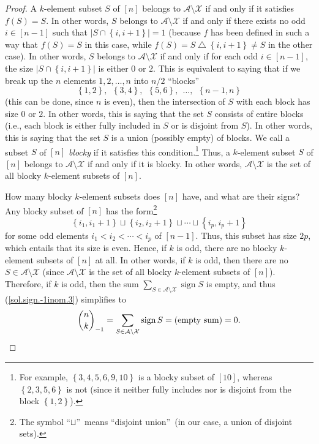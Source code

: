 \begin{proof}
A $k$-element subset $S$ of $\left[  n\right]  $ belongs to $\mathcal{A}%
\setminus\mathcal{X}$ if and only if it satisfies $f\left(  S\right)  =S$. In
other words, $S$ belongs to $\mathcal{A}\setminus\mathcal{X}$ if and only if
there exists no odd $i\in\left[  n-1\right]  $ such that $\left\vert
S\cap\left\{  i,i+1\right\}  \right\vert =1$ (because $f$ has been defined in
such a way that $f\left(  S\right)  =S$ in this case, while $f\left(
S\right)  =S\bigtriangleup\left\{  i,i+1\right\}  \neq S$ in the other case).
In other words, $S$ belongs to $\mathcal{A}\setminus\mathcal{X}$ if and only
if for each odd $i\in\left[  n-1\right]  $, the size $\left\vert S\cap\left\{
i,i+1\right\}  \right\vert $ is either $0$ or $2$. This is equivalent to
saying that if we break up the $n$ elements $1,2,\ldots,n$ into $n/2$
\textquotedblleft blocks\textquotedblright\
\[
\left\{  1,2\right\}  ,\ \ \left\{  3,4\right\}  ,\ \ \left\{  5,6\right\}
,\ \ \ldots,\ \ \left\{  n-1,n\right\}
\]
(this can be done, since $n$ is even), then the intersection of $S$ with each
block has size $0$ or $2$. In other words, this is saying that the set $S$
consists of entire blocks (i.e., each block is either fully included in $S$ or
is disjoint from $S$). In other words, this is saying that the set $S$ is a
union (possibly empty) of blocks. We call a subset $S$ of $\left[  n\right]  $
\emph{blocky} if it satisfies this condition.\footnote{For example, $\left\{
3,4,5,6,9,10\right\}  $ is a blocky subset of $\left[  10\right]  $, whereas
$\left\{  2,3,5,6\right\}  $ is not (since it neither fully includes nor is
disjoint from the block $\left\{  1,2\right\}  $).} Thus, a $k$-element subset
$S$ of $\left[  n\right]  $ belongs to $\mathcal{A}\setminus\mathcal{X}$ if
and only if it is blocky. In other words, $\mathcal{A}\setminus\mathcal{X}$ is
the set of all blocky $k$-element subsets of $\left[  n\right]  $.

How many blocky $k$-element subsets does $\left[  n\right]  $ have, and what
are their signs? Any blocky subset of $\left[  n\right]  $ has the
form\footnote{The symbol \textquotedblleft$\sqcup$\textquotedblright\ means
\textquotedblleft disjoint union\textquotedblright\ (in our case, a union of
disjoint sets).}%
\[
\left\{  i_{1},i_{1}+1\right\}  \sqcup\left\{  i_{2},i_{2}+1\right\}
\sqcup\cdots\sqcup\left\{  i_{p},i_{p}+1\right\}
\]
for some odd elements $i_{1}<i_{2}<\cdots<i_{p}$ of $\left[  n-1\right]  $.
Thus, this subset has size $2p$, which entails that its size is even. Hence,
if $k$ is odd, there are no blocky $k$-element subsets of $\left[  n\right]  $
at all. In other words, if $k$ is odd, then there are no $S\in\mathcal{A}%
\setminus\mathcal{X}$ (since $\mathcal{A}\setminus\mathcal{X}$ is the set of
all blocky $k$-element subsets of $\left[  n\right]  $). Therefore, if $k$ is
odd, then the sum $\sum_{S\in\mathcal{A}\setminus\mathcal{X}}%
\operatorname*{sign}S$ is empty, and thus (\ref{sol.sign.-1inom.3}) simplifies
to%
\begin{equation}
\dbinom{n}{k}_{-1}=\sum_{S\in\mathcal{A}\setminus\mathcal{X}}%
\operatorname*{sign}S=\left(  \text{empty sum}\right)  =0.
\label{sol.sign.-1inom.ev/od}%
\end{equation}



\end{proof}
